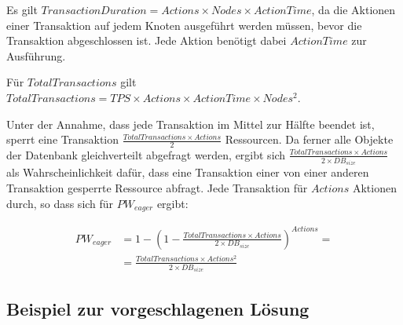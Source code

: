 \documentclass[11pt,a4paper]{scrartcl}
\begin{document}
Es gilt $TransactionDuration = Actions \times Nodes \times ActionTime$, da die Aktionen einer Transaktion auf jedem Knoten ausgeführt werden müssen, bevor die Transaktion abgeschlossen ist.  Jede Aktion benötigt dabei $ActionTime$ zur Ausführung.

Für $TotalTransactions$ gilt $TotalTransactions = TPS \times Actions \times ActionTime \times Nodes^2$.

Unter der Annahme, dass jede Transaktion im Mittel zur Hälfte beendet ist, sperrt eine Transaktion $\frac{TotalTransactions \times Actions}{2}$ Ressourcen.  Da ferner alle Objekte der Datenbank gleichverteilt abgefragt werden, ergibt sich $\frac{TotalTransactions\times Actions}{2 \times DB_{size}}$ als Wahrscheinlichkeit dafür, dass eine Transaktion einer von einer anderen Transaktion gesperrte Ressource abfragt.  Jede Transaktion für $Actions$ Aktionen durch, so dass sich für $PW_{eager}$ ergibt:

\begin{align*}
PW_{eager} &= 1-\left(1 - \frac{TotalTransactions\times Actions}{2 \times DB_{size}}\right)^{Actions} = \\
&= \frac{TotalTransactions \times Actions^2}{2 \times DB_{size}}
\end{align*}


 
\subsection{Beispiel zur vorgeschlagenen Lösung}
\end{document}
